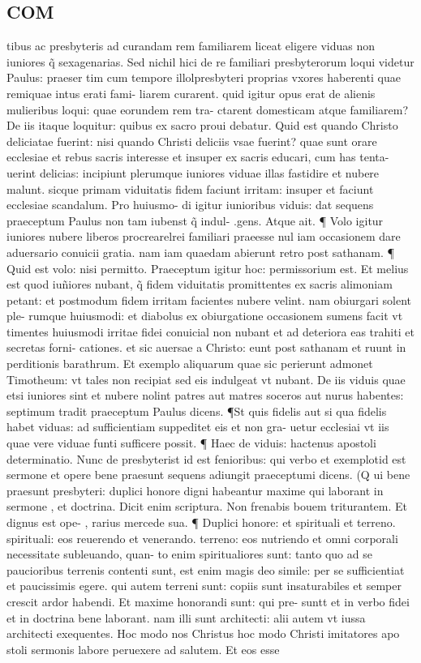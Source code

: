 \documentclass{article}
\begin{document}
\begin{pages}
\section*{COM }
\marginpar{[ p.5 ]}\pstart tibus ac presbyteris ad curandam rem familiarem liceat eligere viduas non iuniores q̃ sexagenarias. Sed nichil hici de re familiari presbyterorum loqui videtur Paulus: praeser tim cum tempore illolpresbyteri proprias vxores haberenti quae remiquae intus erati fami- liarem curarent. quid igitur opus erat de alienis mulieribus loqui: quae eorundem rem tra- ctarent domesticam atque familiarem? De iis itaque loquitur: quibus ex sacro proui debatur. Quid est quando Christo deliciatae fuerint: nisi quando Christi deliciis vsae fuerint? quae sunt orare ecclesiae et rebus sacris interesse et insuper ex sacris educari, cum has tenta- uerint delicias: incipiunt plerumque iuniores viduae illas fastidire et nubere malunt. sicque  primam viduitatis fidem faciunt irritam: insuper et faciunt ecclesiae scandalum. Pro huiusmo- di igitur iunioribus viduis: dat sequens praeceptum Paulus non tam iubenst q̃ indul- .gens. Atque ait. ¶ Volo igitur iuniores nubere liberos procrearelrei familiari praeesse nul  iam occasionem dare aduersario conuicii gratia. nam iam quaedam abierunt retro post  sathanam. ¶ Quid est volo: nisi permitto. Praeceptum igitur hoc: permissorium est. Et melius est quod iuñiores nubant, q̃ fidem viduitatis promittentes ex sacris alimoniam petant: et postmodum fidem irritam facientes nubere velint. nam obiurgari solent ple- rumque huiusmodi: et diabolus ex obiurgatione occasionem sumens facit vt timentes huiusmodi irritae fidei conuicial non nubant et ad deteriora eas trahiti et secretas forni- cationes. et sic auersae a Christo: eunt post sathanam et ruunt in perditionis barathrum. Et exemplo aliquarum quae sic perierunt admonet Timotheum: vt tales non recipiat sed eis indulgeat vt nubant. De iis viduis quae etsi iuniores sint et nubere nolint patres aut matres soceros aut nurus habentes: septimum tradit praeceptum Paulus dicens. ¶St  quis fidelis aut si qua fidelis habet viduas: ad sufficientiam suppeditet eis et non gra- uetur ecclesiai vt iis quae vere viduae funti sufficere possit. ¶ Haec de viduis: hactenus apostoli determinatio. Nunc de presbyterist id est fenioribus: qui verbo et exemplotid est sermone et opere bene praesunt sequens adiungit praeceptumi dicens. (Q ui bene  praesunt presbyteri: duplici honore digni habeantur maxime qui laborant in sermone , et doctrina. Dicit enim scriptura. Non frenabis bouem triturantem. Et dignus est ope- , rarius mercede sua. ¶ Duplici honore: et spirituali et terreno. spirituali: eos reuerendo et venerando. terreno: eos nutriendo et omni corporali necessitate subleuando, quan- to enim spiritualiores sunt: tanto quo ad se paucioribus terrenis contenti sunt, est enim magis deo simile: per se sufficientiat et paucissimis egere. qui autem terreni sunt: copiis sunt insaturabiles et semper crescit ardor habendi. Et maxime honorandi sunt: qui pre- suntt et in verbo fidei et in doctrina bene laborant. nam illi sunt architecti: alii autem vt iussa architecti exequentes. Hoc modo nos Christus hoc modo Christi imitatores apo stoli sermonis labore peruexere ad salutem. Et eos esse 
\end{pages}
\end{document}

